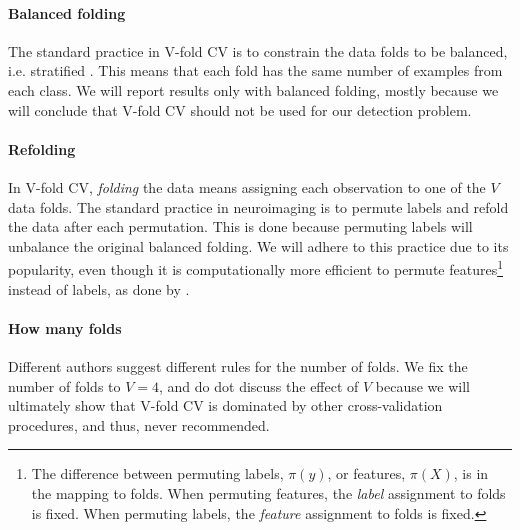 \documentclass[onecolumn,draftclsnofoot]{IEEEtran}
\begin{document}
\paragraph{Balanced folding}
The standard practice in V-fold CV is to constrain the data folds to be balanced, i.e. stratified \cite[for e.g.]{ojala_permutation_2010}.
This means that each fold has the same number of examples from each class. 
We will report results only with balanced folding, mostly because we will conclude that V-fold CV should not be used for our detection problem. 


\paragraph{Refolding}
In V-fold CV, \emph{folding} the data means assigning each observation to one of the $V$ data folds. 
The standard practice in neuroimaging is to permute labels and refold the data after each permutation. 
This is done because permuting labels will unbalance the original balanced folding.
We will adhere to this practice due to its popularity, even though it is computationally more efficient to permute features\footnote{The difference between permuting labels, $\pi(y)$, or features, $\pi(X)$, is in the mapping to folds. When permuting features, the \textit{label} assignment to folds is fixed. When permuting labels, the \textit{feature} assignment to folds is fixed.} instead of labels, as done by \cite{golland_permutation_2005}.


\paragraph{How many folds}
Different authors suggest different rules for the number of folds. 
We fix the number of folds to $V=4$, and do dot discuss the effect of $V$ because we will ultimately show that V-fold CV is dominated by other cross-validation procedures, and thus, never recommended. 

\bigskip
\end{document}
